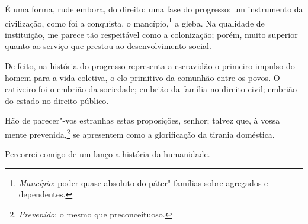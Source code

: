 \begin{linenumbers}
É uma forma, rude embora, do direito; uma fase do progresso; um
instrumento da civilização, como foi a conquista, o
mancípio,\footnote{ \textit{Mancípio}: poder quase absoluto do páter"-famílias
sobre agregados e dependentes.} a gleba. Na qualidade de instituição, me parece tão respeitável como a
colonização; porém, muito superior quanto ao serviço que prestou ao
desenvolvimento social.

De feito, na história do progresso representa a escravidão o primeiro
impulso do homem para a vida coletiva, o elo primitivo da comunhão
entre os povos. O cativeiro foi o embrião da sociedade; embrião da
família no direito civil; embrião do estado no direito público.

Hão de parecer"-vos estranhas estas proposições, senhor; talvez que, à
vossa mente prevenida,\footnote{ \textit{Prevenido}: o mesmo que preconceituoso.} 
se apresentem como a glorificação da tirania doméstica. 

Percorrei comigo de um lanço a história da humanidade. 

\end{linenumbers}

\sectionitem

